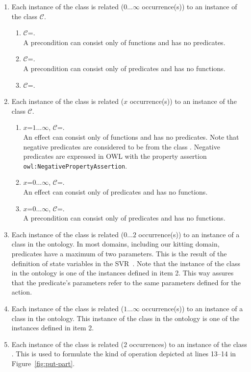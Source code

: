 \begin{enumerate}
  \item Each instance of the class  is related ($0\ldots\infty$ occurrence(s)) to an instance of the class $\mathcal{C}$.
    \begin{enumerate}
      \item $\mathcal{C}$=.\\A precondition can consist only of functions and has no predicates.
       \item $\mathcal{C}$=.\\A precondition can consist only of predicates and has no functions.
       \item $\mathcal{C}$=.
    \end{enumerate}
    \item Each instance of the class  is related ($x$ occurrence(s)) to an instance of the class $\mathcal{C}$.
    \begin{enumerate}
      \item $x$=$1\ldots\infty$, $\mathcal{C}$=.\\An effect can consist only of functions and has no predicates. Note that negative predicates are considered to be from the class . Negative predicates are expressed in OWL with the property assertion \texttt{owl:NegativePropertyAssertion}.
       \item $x$=$0\ldots\infty$, $\mathcal{C}$=.\\An effect can consist only of predicates and has no functions.
       \item $x$=$0\ldots\infty$, $\mathcal{C}$=.\\A precondition can consist only of predicates and has no functions.
    \end{enumerate}
  \item Each instance of the class  is related ($0\ldots2$ occurrence(s)) to an instance of a class in the  ontology. In most domains, including our kitting domain, predicates have a maximum of two parameters. This is the result of the definition of state variables in the SVR~\cite{BALAKIRSKY.IROS.2012}. Note that the instance of the class in the  ontology is one of the instances defined in item 2. This way assures that the predicate's parameters refer to the same parameters defined for the action.
  \item Each instance of the class  is related ($1\ldots\infty$ occurrence(s)) to an instance of a class in the  ontology. This instance of the class in the  ontology is one of the instances defined in item 2.
    \item Each instance of the class  is related ($2$ occurrences) to an instance of the class . This is used to formulate the kind of operation depicted at lines 13--14 in Figure~\ref{fig:put-part}.
\end{enumerate}


